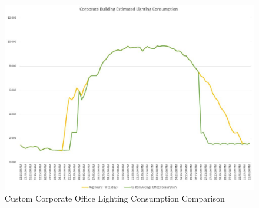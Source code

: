 \begin{figure}[H]
	\hfill\includegraphics[width = 150mm] {images/metering/pme/corporate-building-lighting-consumption-custom}\hspace*{\fill}
	\caption{Custom Corporate Office Lighting Consumption Comparison} 
	\label{fig:data-lighting-consumption-custom}
\end{figure}
 
\newpage